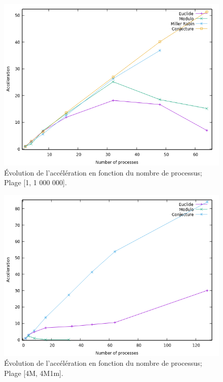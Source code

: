 	\begin{frame}
	\begin{figure}[!ht]	
		\begin{center}\includegraphics[scale=0.55]{Acc_All_1M_v2.png}\end{center}
		\caption{Évolution de l’accélération en fonction du nombre de processus; Plage [1, 1 000 000].}
		\label{fg:fig4}
	\end{figure}	
	\end{frame}
	
	\begin{frame}
	\begin{figure}[!ht]	
		\begin{center}\includegraphics[scale=0.55]{Acc_All_4M.png}\end{center}
		\caption{Évolution de l’accélération en fonction du nombre de processus; Plage [4M, 4M1m].}
		\label{fg:fig4}
	\end{figure}	
	\end{frame}
		
